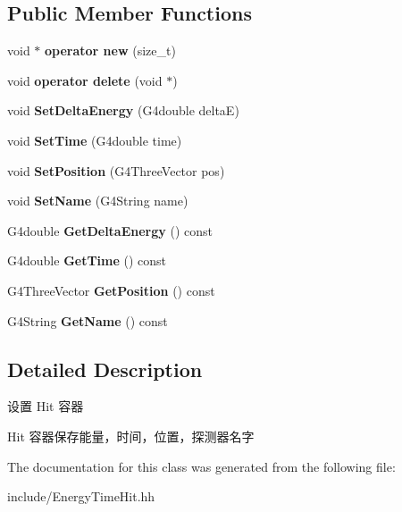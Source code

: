 \subsection*{Public Member Functions}
\begin{DoxyCompactItemize}
\item 
\mbox{\label{classEnergyTimeHit_a13352f0fdc7bf25e3655b803b50ae9ca}} 
void $\ast$ {\bfseries operator new} (size\+\_\+t)
\item 
\mbox{\label{classEnergyTimeHit_ab146f5c1aec4e913a416faee3b2ff60b}} 
void {\bfseries operator delete} (void $\ast$)
\item 
\mbox{\label{classEnergyTimeHit_ab7a9602285c51cf42566382df8277147}} 
void {\bfseries Set\+Delta\+Energy} (G4double deltaE)
\item 
\mbox{\label{classEnergyTimeHit_a139ed317e433a0ddef477117f39daf8a}} 
void {\bfseries Set\+Time} (G4double time)
\item 
\mbox{\label{classEnergyTimeHit_a987123b85e019adc1f01332bb23c3f2c}} 
void {\bfseries Set\+Position} (G4\+Three\+Vector pos)
\item 
\mbox{\label{classEnergyTimeHit_aadf608ec3e5d06c9735546b29a0f92b4}} 
void {\bfseries Set\+Name} (G4\+String name)
\item 
\mbox{\label{classEnergyTimeHit_a15aae5ff8efc3a4efc39c00c26308836}} 
G4double {\bfseries Get\+Delta\+Energy} () const
\item 
\mbox{\label{classEnergyTimeHit_ab7f49eaf401c5b559876d69330c57c78}} 
G4double {\bfseries Get\+Time} () const
\item 
\mbox{\label{classEnergyTimeHit_a4611709e7caf2e34f4e368dd8c4e8ad4}} 
G4\+Three\+Vector {\bfseries Get\+Position} () const
\item 
\mbox{\label{classEnergyTimeHit_a7e348ee943ce7065910e75b0063108d5}} 
G4\+String {\bfseries Get\+Name} () const
\end{DoxyCompactItemize}


\subsection{Detailed Description}
设置 Hit 容器 

Hit 容器保存能量，时间，位置，探测器名字 

The documentation for this class was generated from the following file\+:\begin{DoxyCompactItemize}
\item 
include/Energy\+Time\+Hit.\+hh\end{DoxyCompactItemize}
